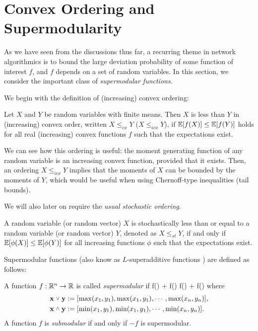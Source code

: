 \section{Convex Ordering and Supermodularity}
\label{sec:supermodular}

As we have seen from the discussions thus far, a recurring theme in network algorithmics is to bound 
the large deviation probability of some function of interest $f$, and $f$ depends on a set of random
variables. In this section, we consider the important class of \textit{supermodular functions}.

We begin with the definition of (increasing) convex ordering:
\begin{defn}
Let $X$ and $Y$ be
random variables with finite means. Then $X$ is
less than $Y$ in (increasing) convex order, written $X \le_{cx} Y$
($X \le_{icx} Y$), if $\mathbb E[f(X)] \le \mathbb E[f(Y)]$ holds for all real
(increasing) convex functions $f$ such that the expectations
exist.
\label{def:convex_order}
\end{defn}

We can see how this ordering is useful: the moment generating function of any
random variable is an increasing convex function, provided that it exists. Then,
an ordering $X \le_{icx} Y$ implies that the moments of $X$ can be bounded by the
moments of $Y$, which would be useful when using Chernoff-type inequalities (tail
bounds).

We will also later on require the \textit{usual stochastic ordering}.
\begin{defn}
A random variable (or random vector) $X$ is stochastically less than or equal to a random 
variable (or random vector) $Y$, denoted as $X \le_{st} Y$, if and only if $\mathbb E[\phi(X)]
\le \mathbb E[\phi(Y)]$ for all increasing functions $\phi$ such that the expectations exist.
\label{defn:st_order}
\end{defn}

Supermodular functions (also know as $L$-superadditive functions \cite{Block89Ladditive}) are defined as follows:
\begin{defn}
A function $f: \mathbb R^n \to \mathbb R$ is called \textit{supermodular} if 
\ben
f(\bx \join \by) + f(\bx \meet \by) \ge f(\bx) + f(\by)
\een
where
\begin{align*}
\bx \join \by &:= \lbrack \max(x_1,y_1), \max(x_1,y_1), \cdots, \max(x_n,y_n)\rbrack,\\
\bx \meet \by &:= \lbrack \min(x_1,y_1), \min(x_1,y_1), \cdots, \min(x_n,y_n)\rbrack.
\end{align*}
A function $f$ is \textit{submodular} if and only if $-f$ is supermodular.
\end{defn}

